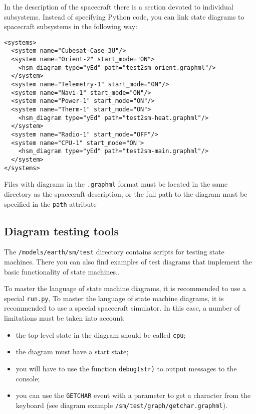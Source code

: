 \documentclass[12pt,a4paper]{article}
\begin{document}
In the description of the spacecraft there is a section devoted to individual subsystems. Instead of specifying Python code, you can link state diagrams to spacecraft subsystems in the following way:

\begin{verbatim}
<systems>
  <system name="Cubesat-Case-3U"/>
  <system name="Orient-2" start_mode="ON">
    <hsm_diagram type="yEd" path="test2sm-orient.graphml"/>
  </system>
  <system name="Telemetry-1" start_mode="ON"/>
  <system name="Navi-1" start_mode="ON"/>
  <system name="Power-1" start_mode="ON"/>
  <system name="Therm-1" start_mode="ON">
    <hsm_diagram type="yEd" path="test2sm-heat.graphml"/>
  </system>
  <system name="Radio-1" start_mode="OFF"/>
  <system name="CPU-1" start_mode="ON">
    <hsm_diagram type="yEd" path="test2sm-main.graphml"/>
  </system>
</systems>
\end{verbatim}

Files with diagrams in the \verb'.graphml' format must be located in the same directory as the spacecraft description, or the full path to the diagram must be specified in the \verb'path' attribute

\subsection*{Diagram testing tools}

The \verb'/models/earth/sm/test' directory contains scripts for testing state machines. There you can also find examples of test diagrams that implement the basic functionality of state machines..

To master the language of state machine diagrams, it is recommended to use a special \verb'run.py', To master the language of state machine diagrams, it is recommended to use a special spacecraft simulator. In this case, a number of limitations must be taken into account:

\begin{itemize}
\item the top-level state in the diagram should be called \verb'cpu';
\item the diagram must have a start state;
\item you will have to use the function \verb'debug(str)' to output messages to the console;
\item you can use the \verb'GETCHAR' event with a parameter to get a character from the keyboard (see diagram example \verb'/sm/test/graph/getchar.graphml').
\end{itemize}
\end{document}
